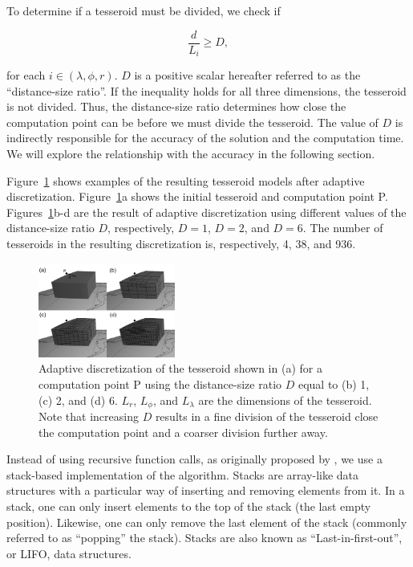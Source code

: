 \documentclass[paper,twocolumn,twoside]{geophysics}
\begin{document}
To determine if a tesseroid must be divided,
we check if

\begin{equation}
    \frac{d}{L_i} \geq D,
    \label{eq:condition}
\end{equation}

\noindent
for each $i \in (\lambda, \phi, r)$.
$D$ is a positive scalar
hereafter referred to as the ``distance-size ratio''.
If the inequality holds for all three dimensions,
the tesseroid is not divided.
Thus, the distance-size ratio determines
how close the computation point can be
before we must divide the tesseroid.
The value of $D$ is indirectly responsible for
the accuracy of the solution and the computation time.
We will explore the relationship with the accuracy in the following section.

Figure~\ref{fig:division} shows examples of
the resulting tesseroid models after adaptive discretization.
Figure~\ref{fig:division}a shows
the initial tesseroid and computation point P.
Figures~\ref{fig:division}b-d are
the result of adaptive discretization using
different values of the distance-size ratio $D$,
respectively,
$D=1$, $D=2$, and $D=6$.
The number of tesseroids in the resulting discretization is, respectively,
4, 38, and 936.

\begin{figure}
    \centering
    \includegraphics[width=0.4\textwidth]{figs/tesseroid-split}
    \caption{
        Adaptive discretization
        of the tesseroid shown in (a)
        for a computation point P
        using the distance-size ratio $D$ equal to
        (b) 1, (c) 2, and (d) 6.
        $L_r$, $L_\phi$, and $L_\lambda$ are the dimensions of the tesseroid.
        Note that increasing $D$
        results in a fine division of the tesseroid
        close the computation point
        and a coarser division further away.
    }
    \label{fig:division}
\end{figure}

Instead of using recursive function calls,
as originally proposed by \citet{Li2011},
we use a stack-based implementation of the algorithm.
Stacks are array-like data structures
with a particular way of inserting and removing elements from it.
In a stack,
one can only insert elements to the top of the stack
(the last empty position).
Likewise,
one can only remove the last element of the stack
(commonly referred to as ``popping'' the stack).
Stacks are also known as ``Last-in-first-out'', or LIFO, data structures.
\end{document}
